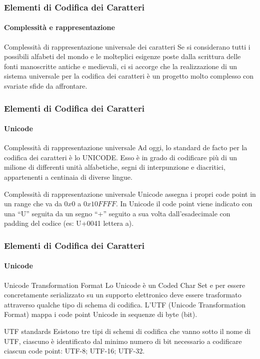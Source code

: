 \begin{frame}
	\frametitle{Elementi di Codifica dei Caratteri}
	\framesubtitle{Complessità e rappresentazione}
	\addtocounter{nframe}{1}

	\begin{block}{Complessità di rappresentazione universale dei caratteri}
		Se si considerano tutti i possibili alfabeti del mondo e le molteplici esigenze poste dalla scrittura delle fonti manoscritte antiche e medievali, ci si accorge che la realizzazione di un sistema universale per la codifica dei caratteri è un progetto molto complesso con svariate sfide da affrontare.
	\end{block}

\end{frame}


\begin{frame}
	\frametitle{Elementi di Codifica dei Caratteri}
	\framesubtitle{Unicode}
	\addtocounter{nframe}{1}

	\begin{block}{Complessità di rappresentazione universale}
		Ad oggi, lo standard de facto per la codifica dei caratteri è lo UNICODE. Esso è in grado di codificare più di un milione di differenti unità alfabetiche, segni di interpunzione e diacritici, appartenenti a centinaia di diverse lingue.
	\end{block}

	\begin{block}{Complessità di rappresentazione universale}
		Unicode assegna i propri code point in un range che va da $0x0$ a $0x10FFFF$. In Unicode il code point viene  indicato con una ``U'' seguita da un segno ``+'' seguito a sua volta dall'esadecimale con padding del codice (es: U+0041 lettera a).
	\end{block}

\end{frame}

\begin{frame}
	\frametitle{Elementi di Codifica dei Caratteri}
	\framesubtitle{Unicode}
	\addtocounter{nframe}{1}

	\begin{block}{Unicode Transformation Format}
		Lo Unicode è un Coded Char Set e per essere concretamente serializzato su un supporto elettronico deve essere trasformato attraverso qualche tipo di schema di codifica.
		L'UTF (Unicode Transformation Format) mappa i code point Unicode in sequenze di byte (bit).
	\end{block}

	\begin{block}{UTF standards}
		Esistono tre tipi di schemi di codifica che vanno sotto il nome di UTF, ciascuno è identificato dal minimo numero di bit necessario a codificare ciascun code point: UTF-8; UTF-16; UTF-32. 
	\end{block}

\end{frame}

